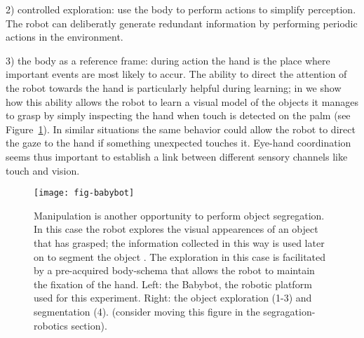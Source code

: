 2) controlled exploration: use the body to perform actions to simplify perception. The robot can deliberatly generate redundant information by performing periodic actions in the environment.

3) the body as a reference frame: during action the hand is the place where important events are most likely to accur. The ability to direct the attention of the robot towards the hand is particularly helpful during learning; in \cite{natale05exploring} we show how this ability allows the robot to learn a visual model of the objects it manages to grasp by simply inspecting the hand when touch is detected on the palm (see Figure~\ref{fig:babybot}). In similar situations the same behavior could allow the robot to direct the gaze to the hand if something unexpected touches it. Eye-hand coordination seems thus important to establish a link between different sensory channels like touch and vision.


\begin{figure}[t]

\centerline{
\texttt{[image: fig-babybot]}
}

\caption{
%
Manipulation is another opportunity to perform object segregation. In this case the robot explores the visual appearences of an object that has grasped; the information collected in this way is used later on to segment the object \cite{natale05exploring}. The exploration in this case is facilitated by a pre-acquired body-schema that allows the robot to maintain the fixation of the hand. Left: the Babybot, the robotic platform used for this experiment. Right: the object exploration (1-3) and segmentation (4). (consider moving this figure in the segragation-robotics section). 
%
}

\label{fig:babybot}

\end{figure}


